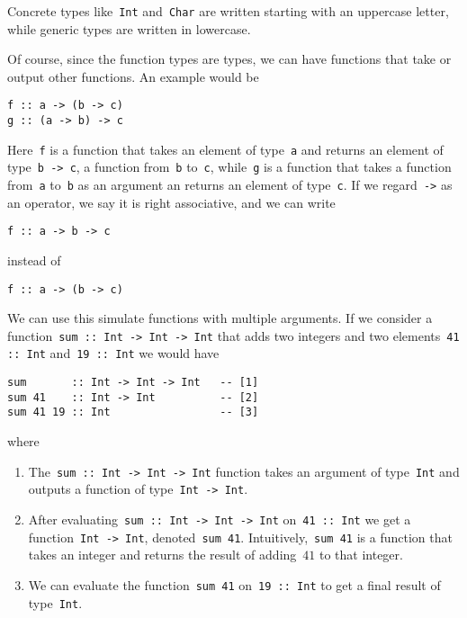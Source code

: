 \documentclass[../TFG.tex]{subfiles}
\begin{document}
Concrete types like~\texttt{Int} and~\texttt{Char} are
written starting with an uppercase letter, while generic types are written in
lowercase.

Of course, since the function types are types, we can have functions that take
or output other functions. An example would be
\begin{verbatim}
f :: a -> (b -> c)
g :: (a -> b) -> c
\end{verbatim}
Here~\texttt{f} is a function that takes an element of
type~\texttt{a} and returns an element of
type~\texttt{b -> c}, \ie a function from~\texttt{b}
to~\texttt{c}, while~\texttt{g} is a function that
takes a function from~\texttt{a} to~\texttt{b} as an
argument an returns an element of type~\texttt{c}. If we
regard~\texttt{->} as an operator, we say it is right associative,
and we can write
\begin{verbatim}
f :: a -> b -> c
\end{verbatim}
instead of
\begin{verbatim}
f :: a -> (b -> c)
\end{verbatim}

We can use this simulate functions with multiple arguments.
If we consider a function~\texttt{sum :: Int -> Int -> Int} that
adds two integers and two elements~\texttt{41 :: Int}
and~\texttt{19 :: Int} we would have
\begin{verbatim}
sum       :: Int -> Int -> Int   -- [1]
sum 41    :: Int -> Int          -- [2]
sum 41 19 :: Int                 -- [3]
\end{verbatim}
where
\begin{enumerate}
    \item The~\texttt{sum :: Int -> Int -> Int} function takes an
        argument of type~\texttt{Int} and outputs a function of
        type~\texttt{Int -> Int}.
    \item After evaluating~\texttt{sum :: Int -> Int -> Int}
        on~\texttt{41 :: Int} we get a
        function~\texttt{Int -> Int},
        denoted~\texttt{sum 41}.
        Intuitively,~\texttt{sum 41} is a function that takes an
        integer and returns the result of adding~\(41\) to that integer.
    \item We can evaluate the function~\texttt{sum 41}
        on~\texttt{19 :: Int} to get a final result of
        type~\texttt{Int}.
\end{enumerate}
\end{document}
